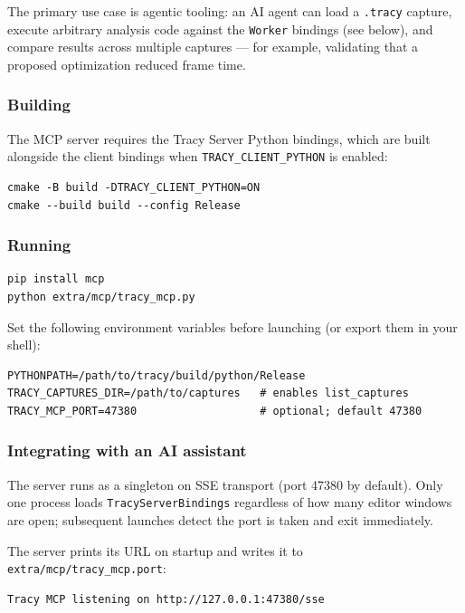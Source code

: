 \documentclass[hidelinks,titlepage,a4paper,twoside]{article}
\begin{document}
The primary use case is agentic tooling: an AI agent can load a \texttt{.tracy} capture, execute arbitrary analysis code against the \texttt{Worker} bindings (see below), and compare results across multiple captures — for example, validating that a proposed optimization reduced frame time.

\subsubsection{Building}

The MCP server requires the Tracy Server Python bindings, which are built alongside the client bindings when \texttt{TRACY\_CLIENT\_PYTHON} is enabled:

\begin{lstlisting}
cmake -B build -DTRACY_CLIENT_PYTHON=ON
cmake --build build --config Release
\end{lstlisting}

\subsubsection{Running}

\begin{lstlisting}
pip install mcp
python extra/mcp/tracy_mcp.py
\end{lstlisting}

Set the following environment variables before launching (or export them in your shell):

\begin{lstlisting}
PYTHONPATH=/path/to/tracy/build/python/Release
TRACY_CAPTURES_DIR=/path/to/captures   # enables list_captures
TRACY_MCP_PORT=47380                   # optional; default 47380
\end{lstlisting}

\subsubsection{Integrating with an AI assistant}

The server runs as a singleton on SSE transport (port 47380 by default). Only one process loads \texttt{TracyServerBindings} regardless of how many editor windows are open; subsequent launches detect the port is taken and exit immediately.

The server prints its URL on startup and writes it to \texttt{extra/mcp/tracy\_mcp.port}:

\begin{lstlisting}
Tracy MCP listening on http://127.0.0.1:47380/sse
\end{lstlisting}
\end{document}
